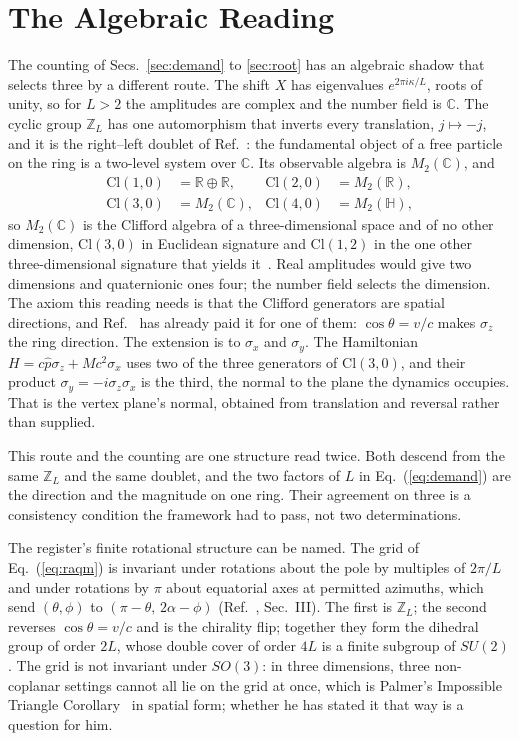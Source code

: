 \documentclass[aps,prd,twocolumn,superscriptaddress,nofootinbib]{revtex4-2}
\begin{document}
\section{The Algebraic Reading}
\label{sec:algebra}

The counting of Secs.~\ref{sec:demand} to \ref{sec:root} has an algebraic shadow that selects three by a different route. The shift $X$ has eigenvalues $e^{2\pi i\kappa/L}$, roots of unity, so for $L > 2$ the amplitudes are complex and the number field is $\mathbb{C}$. The cyclic group $\mathbb{Z}_L$ has one automorphism that inverts every translation, $j \mapsto -j$, and it is the right--left doublet of Ref.~\cite{korytko2026c}: the fundamental object of a free particle on the ring is a two-level system over $\mathbb{C}$. Its observable algebra is $M_2(\mathbb{C})$, and
\begin{align}
\mathrm{Cl}(1,0) &= \mathbb{R}\oplus\mathbb{R}, & \mathrm{Cl}(2,0) &= M_2(\mathbb{R}), \nonumber\\
\mathrm{Cl}(3,0) &= M_2(\mathbb{C}), & \mathrm{Cl}(4,0) &= M_2(\mathbb{H}),
\label{eq:clifford}
\end{align}
so $M_2(\mathbb{C})$ is the Clifford algebra of a three-dimensional space and of no other dimension, $\mathrm{Cl}(3,0)$ in Euclidean signature and $\mathrm{Cl}(1,2)$ in the one other three-dimensional signature that yields it~\cite{lounesto2001}. Real amplitudes would give two dimensions and quaternionic ones four; the number field selects the dimension. The axiom this reading needs is that the Clifford generators are spatial directions, and Ref.~\cite{korytko2026c} has already paid it for one of them: $\cos\theta = v/c$ makes $\sigma_z$ the ring direction. The extension is to $\sigma_x$ and $\sigma_y$. The Hamiltonian $H = c\hat p\sigma_z + Mc^2\sigma_x$ uses two of the three generators of $\mathrm{Cl}(3,0)$, and their product $\sigma_y = -i\sigma_z\sigma_x$ is the third, the normal to the plane the dynamics occupies. That is the vertex plane's normal, obtained from translation and reversal rather than supplied.

This route and the counting are one structure read twice. Both descend from the same $\mathbb{Z}_L$ and the same doublet, and the two factors of $L$ in Eq.~(\ref{eq:demand}) are the direction and the magnitude on one ring. Their agreement on three is a consistency condition the framework had to pass, not two determinations.

The register's finite rotational structure can be named. The grid of Eq.~(\ref{eq:raqm}) is invariant under rotations about the pole by multiples of $2\pi/L$ and under rotations by $\pi$ about equatorial axes at permitted azimuths, which send $(\theta,\phi)$ to $(\pi-\theta,\,2\alpha-\phi)$ (Ref.~\cite{korytko2026c}, Sec.~III). The first is $\mathbb{Z}_L$; the second reverses $\cos\theta = v/c$ and is the chirality flip; together they form the dihedral group of order $2L$, whose double cover of order $4L$ is a finite subgroup of $SU(2)$. The grid is not invariant under $SO(3)$: in three dimensions, three non-coplanar settings cannot all lie on the grid at once, which is Palmer's Impossible Triangle Corollary~\cite{palmer2026b,palmer2026c} in spatial form; whether he has stated it that way is a question for him.
\end{document}
